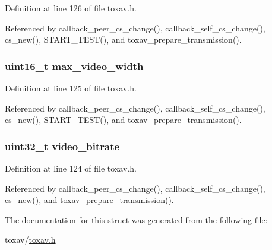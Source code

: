 Definition at line 126 of file toxav.\+h.



Referenced by callback\+\_\+peer\+\_\+cs\+\_\+change(), callback\+\_\+self\+\_\+cs\+\_\+change(), cs\+\_\+new(), S\+T\+A\+R\+T\+\_\+\+T\+E\+S\+T(), and toxav\+\_\+prepare\+\_\+transmission().

\hypertarget{struct___tox_av_c_settings_ab81ecded1f7c46e120c8f2afa7b2c5cc}{
\subsubsection[{max\+\_\+video\+\_\+width}]{\setlength{\rightskip}{0pt plus 5cm}uint16\+\_\+t max\+\_\+video\+\_\+width}}\label{struct___tox_av_c_settings_ab81ecded1f7c46e120c8f2afa7b2c5cc}


Definition at line 125 of file toxav.\+h.



Referenced by callback\+\_\+peer\+\_\+cs\+\_\+change(), callback\+\_\+self\+\_\+cs\+\_\+change(), cs\+\_\+new(), S\+T\+A\+R\+T\+\_\+\+T\+E\+S\+T(), and toxav\+\_\+prepare\+\_\+transmission().

\hypertarget{struct___tox_av_c_settings_af0eac99d4181795e8a595d244e745192}{
\subsubsection[{video\+\_\+bitrate}]{\setlength{\rightskip}{0pt plus 5cm}uint32\+\_\+t video\+\_\+bitrate}}\label{struct___tox_av_c_settings_af0eac99d4181795e8a595d244e745192}


Definition at line 124 of file toxav.\+h.



Referenced by callback\+\_\+peer\+\_\+cs\+\_\+change(), callback\+\_\+self\+\_\+cs\+\_\+change(), cs\+\_\+new(), and toxav\+\_\+prepare\+\_\+transmission().



The documentation for this struct was generated from the following file\+:\begin{DoxyCompactItemize}
\item 
toxav/\hyperlink{toxav_8h}{toxav.\+h}\end{DoxyCompactItemize}

